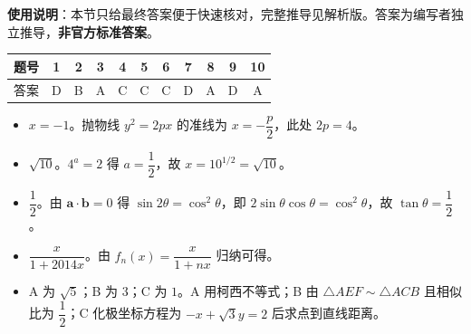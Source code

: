 
\begin{gknotice}
\textbf{使用说明}：本节只给最终答案便于快速核对，完整推导见解析版。答案为编写者独立推导，\textbf{非官方标准答案}。
\end{gknotice}

\begin{center}\begin{tabular}{ccccccccccc}
\toprule
题号 & 1 & 2 & 3 & 4 & 5 & 6 & 7 & 8 & 9 & 10 \\
\midrule
答案 & D & B & A & C & C & C & D & A & D & A \\
\bottomrule
\end{tabular}\end{center}

\begin{itemize}[leftmargin=2.6em]
  \item[\textbf{11.}] $x=-1$。抛物线 $y^2=2px$ 的准线为 $x=-\dfrac p2$，此处 $2p=4$。
  \item[\textbf{12.}] $\sqrt{10}$。$4^a=2$ 得 $a=\dfrac12$，故 $x=10^{1/2}=\sqrt{10}$。
  \item[\textbf{13.}] $\dfrac12$。由 $\boldsymbol a\cdot\boldsymbol b=0$ 得 $\sin2\theta=\cos^2\theta$，即 $2\sin\theta\cos\theta=\cos^2\theta$，故 $\tan\theta=\dfrac12$。
  \item[\textbf{14.}] $\dfrac{x}{1+2014x}$。由 $f_n(x)=\dfrac{x}{1+nx}$ 归纳可得。
  \item[\textbf{15.}] A 为 $\sqrt5$；B 为 $3$；C 为 $1$。A 用柯西不等式；B 由 $\triangle AEF\sim\triangle ACB$ 且相似比为 $\dfrac12$；C 化极坐标方程为 $-x+\sqrt3y=2$ 后求点到直线距离。
\end{itemize}

